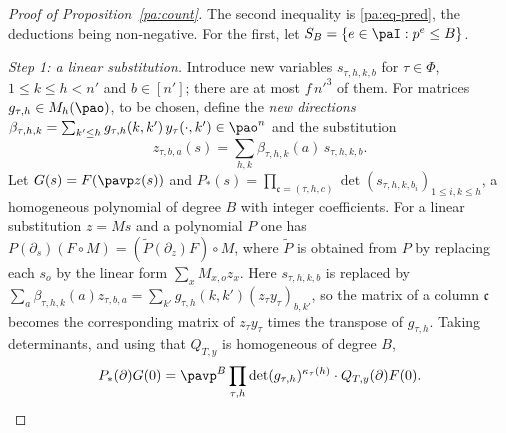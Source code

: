 \documentclass[10pt]{amsart}
\theoremstyle{definition}
\theoremstyle{remark}
\providecommand{\auPl}{\Phi}
\begin{document}
\begin{proof}[Proof of Proposition~\ref{pa:count}]
The second inequality is \eqref{pa:eq-pred}, the deductions being non-negative. For the first, let
$S_B=\{e\in\paI:p^e\le B\}$.

\emph{Step 1: a linear substitution.} Introduce new variables $s_{\tau,h,k,b}$ for $\tau\in\auPl$,
$1\le k\le h<n'$ and $b\in[n']$; there are at most $f\,n'^3$ of them. For matrices
$g_{\tau,h}\in M_h(\pao)$, to be chosen, define the \emph{new directions}
$\beta_{\tau,h,k}=\sum_{k'\le h}g_{\tau,h}(k,k')\,y_\tau(\cdot,k')\in\pao^n$ and the substitution
\[
z_{\tau,b,a}(s)=\sum_{h,k}\beta_{\tau,h,k}(a)\,s_{\tau,h,k,b}.
\]
Let $G(s)=F(\pavp z(s))$ and $P_*(s)=\prod_{\mathfrak c=(\tau,h,c)}\det(s_{\tau,h,k,b_i})_{1\le
i,k\le h}$, a homogeneous polynomial of degree $B$ with integer coefficients. For a linear
substitution $z=Ms$ and a polynomial $P$ one has $P(\partial_s)(F\circ M)=(\widetilde
P(\partial_z)F)\circ M$, where $\widetilde P$ is obtained from $P$ by replacing each $s_o$ by the
linear form $\sum_xM_{x,o}z_x$. Here $s_{\tau,h,k,b}$ is replaced by
$\sum_a\beta_{\tau,h,k}(a)z_{\tau,b,a}=\sum_{k'}g_{\tau,h}(k,k')(z_\tau y_\tau)_{b,k'}$, so the
matrix of a column $\mathfrak c$ becomes the corresponding matrix of $z_\tau y_\tau$ times the
transpose of $g_{\tau,h}$. Taking determinants, and using that $Q_{T,y}$ is homogeneous of degree
$B$,
\begin{equation}\label{pa:eq-chain}
P_*(\partial)G(0)=\pavp^{B}\prod_{\tau,h}\det(g_{\tau,h})^{\kappa_\tau(h)}\cdot Q_{T,y}(\partial)F(0).
\end{equation}


\end{proof}
\end{document}
